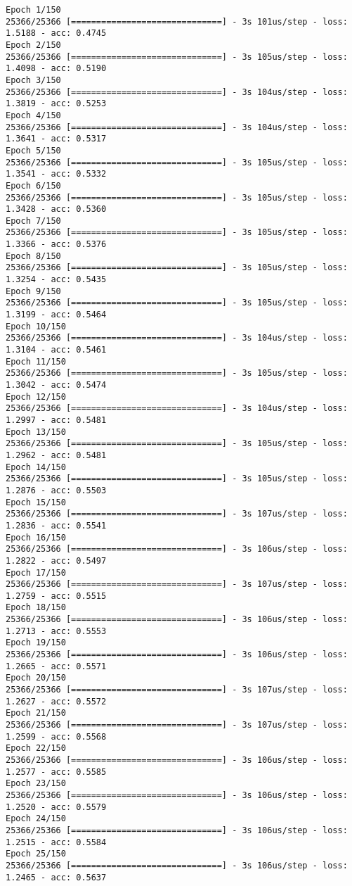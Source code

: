 \documentclass[11pt]{article}
\begin{document}
    \begin{Verbatim}[commandchars=\\\{\}]
Epoch 1/150
25366/25366 [==============================] - 3s 101us/step - loss: 1.5188 - acc: 0.4745
Epoch 2/150
25366/25366 [==============================] - 3s 105us/step - loss: 1.4098 - acc: 0.5190
Epoch 3/150
25366/25366 [==============================] - 3s 104us/step - loss: 1.3819 - acc: 0.5253
Epoch 4/150
25366/25366 [==============================] - 3s 104us/step - loss: 1.3641 - acc: 0.5317
Epoch 5/150
25366/25366 [==============================] - 3s 105us/step - loss: 1.3541 - acc: 0.5332
Epoch 6/150
25366/25366 [==============================] - 3s 105us/step - loss: 1.3428 - acc: 0.5360
Epoch 7/150
25366/25366 [==============================] - 3s 105us/step - loss: 1.3366 - acc: 0.5376
Epoch 8/150
25366/25366 [==============================] - 3s 105us/step - loss: 1.3254 - acc: 0.5435
Epoch 9/150
25366/25366 [==============================] - 3s 105us/step - loss: 1.3199 - acc: 0.5464
Epoch 10/150
25366/25366 [==============================] - 3s 104us/step - loss: 1.3104 - acc: 0.5461
Epoch 11/150
25366/25366 [==============================] - 3s 105us/step - loss: 1.3042 - acc: 0.5474
Epoch 12/150
25366/25366 [==============================] - 3s 104us/step - loss: 1.2997 - acc: 0.5481
Epoch 13/150
25366/25366 [==============================] - 3s 105us/step - loss: 1.2962 - acc: 0.5481
Epoch 14/150
25366/25366 [==============================] - 3s 105us/step - loss: 1.2876 - acc: 0.5503
Epoch 15/150
25366/25366 [==============================] - 3s 107us/step - loss: 1.2836 - acc: 0.5541
Epoch 16/150
25366/25366 [==============================] - 3s 106us/step - loss: 1.2822 - acc: 0.5497
Epoch 17/150
25366/25366 [==============================] - 3s 107us/step - loss: 1.2759 - acc: 0.5515
Epoch 18/150
25366/25366 [==============================] - 3s 106us/step - loss: 1.2713 - acc: 0.5553
Epoch 19/150
25366/25366 [==============================] - 3s 106us/step - loss: 1.2665 - acc: 0.5571
Epoch 20/150
25366/25366 [==============================] - 3s 107us/step - loss: 1.2627 - acc: 0.5572
Epoch 21/150
25366/25366 [==============================] - 3s 107us/step - loss: 1.2599 - acc: 0.5568
Epoch 22/150
25366/25366 [==============================] - 3s 106us/step - loss: 1.2577 - acc: 0.5585
Epoch 23/150
25366/25366 [==============================] - 3s 106us/step - loss: 1.2520 - acc: 0.5579
Epoch 24/150
25366/25366 [==============================] - 3s 106us/step - loss: 1.2515 - acc: 0.5584
Epoch 25/150
25366/25366 [==============================] - 3s 106us/step - loss: 1.2465 - acc: 0.5637

\end{Verbatim}
\end{document}
